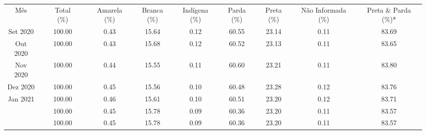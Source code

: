 \documentclass[12pt]{article}
\begin{document}
\begin{landscape}
\begin{table}[htbp]
\begin{adjustbox}{max width=\linewidth}
\begin{tabular}{lllllllllll}
\cmidrule{1-3}\cmidrule{5-11}  \multicolumn{1}{c}{Mês} &      & \multicolumn{1}{c}{Total (\%)} &      & \multicolumn{1}{c}{Amarela (\%)} & \multicolumn{1}{c}{Branca (\%)} & \multicolumn{1}{c}{Indígena (\%)} & \multicolumn{1}{c}{Parda (\%)} & \multicolumn{1}{c}{Preta (\%)} & \multicolumn{1}{c}{Não Informada (\%)} & \multicolumn{1}{c}{Preta \& Parda (\%)*} \\
\cmidrule{1-3}\cmidrule{5-11}    \multicolumn{1}{c}{Set 2020} &      & \multicolumn{1}{c}{100.00} &      & \multicolumn{1}{c}{0.43} & \multicolumn{1}{c}{15.64} & \multicolumn{1}{c}{0.12} & \multicolumn{1}{c}{60.55} & \multicolumn{1}{c}{23.14} & \multicolumn{1}{c}{0.11} & \multicolumn{1}{c}{83.69} \\
    \multicolumn{1}{c}{Out 2020} &      & \multicolumn{1}{c}{100.00} &      & \multicolumn{1}{c}{0.43} & \multicolumn{1}{c}{15.68} & \multicolumn{1}{c}{0.12} & \multicolumn{1}{c}{60.52} & \multicolumn{1}{c}{23.13} & \multicolumn{1}{c}{0.11} & \multicolumn{1}{c}{83.65} \\
    \multicolumn{1}{c}{Nov 2020} &      & \multicolumn{1}{c}{100.00} &      & \multicolumn{1}{c}{0.44} & \multicolumn{1}{c}{15.55} & \multicolumn{1}{c}{0.11} & \multicolumn{1}{c}{60.60} & \multicolumn{1}{c}{23.21} & \multicolumn{1}{c}{0.11} & \multicolumn{1}{c}{83.80} \\
    \multicolumn{1}{c}{Dez 2020} &      & \multicolumn{1}{c}{100.00} &      & \multicolumn{1}{c}{0.45} & \multicolumn{1}{c}{15.56} & \multicolumn{1}{c}{0.10} & \multicolumn{1}{c}{60.48} & \multicolumn{1}{c}{23.28} & \multicolumn{1}{c}{0.12} & \multicolumn{1}{c}{83.76} \\
    \multicolumn{1}{c}{Jan 2021} &      & \multicolumn{1}{c}{100.00} &      & \multicolumn{1}{c}{0.46} & \multicolumn{1}{c}{15.61} & \multicolumn{1}{c}{0.10} & \multicolumn{1}{c}{60.51} & \multicolumn{1}{c}{23.20} & \multicolumn{1}{c}{0.12} & \multicolumn{1}{c}{83.71} \\
    \rowcolor[rgb]{ .851,  .851,  .851} \multicolumn{1}{c}{Fev 2021} &      & \multicolumn{1}{c}{100.00} &      & \multicolumn{1}{c}{0.45} & \multicolumn{1}{c}{15.78} & \multicolumn{1}{c}{0.09} & \multicolumn{1}{c}{60.36} & \multicolumn{1}{c}{23.20} & \multicolumn{1}{c}{0.11} & \multicolumn{1}{c}{83.57} \\
    \rowcolor[rgb]{ .851,  .851,  .851} \multicolumn{1}{c}{Mar 2021} &      & \multicolumn{1}{c}{100.00} &      & \multicolumn{1}{c}{0.45} & \multicolumn{1}{c}{15.78} & \multicolumn{1}{c}{0.09} & \multicolumn{1}{c}{60.36} & \multicolumn{1}{c}{23.20} & \multicolumn{1}{c}{0.11} & \multicolumn{1}{c}{83.57} \\

\end{tabular}
\end{adjustbox}
\end{table}
\end{landscape}
\end{document}
